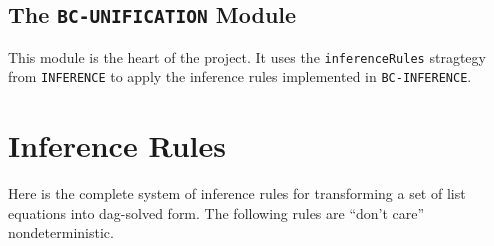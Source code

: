\documentclass[11pt]{article}
\begin{document}
\subsection{The \lstinline|BC-UNIFICATION| Module}\label{subsection:bc-unif-mod}

This module is the heart of the project. It uses the \lstinline|inferenceRules|
stragtegy from \lstinline|INFERENCE| to apply the inference rules implemented
in \lstinline|BC-INFERENCE|.

\newpage
\appendix

\section{Inference Rules}\label{appendix:inference}

Here is the complete system of inference rules for transforming a set of list
equations into dag-solved form. The following rules are ``don't care''
nondeterministic.
\end{document}

